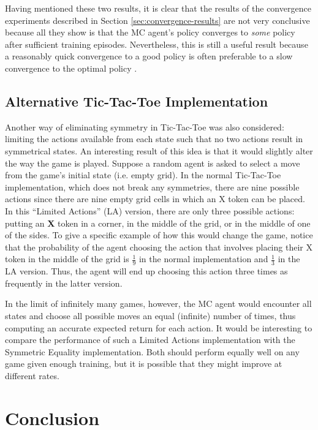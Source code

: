 \documentclass[11pt,a4paper,twoside,openright]{report}
\begin{document}
Having mentioned these two results, it is clear that the results of the convergence experiments described in Section \ref{sec:convergence-results} are not very conclusive because all they show is that the MC agent's policy converges to \emph{some} policy after sufficient training episodes. Nevertheless, this is still a useful result because a reasonably quick convergence to a good policy is often preferable to a slow convergence to the optimal policy \cite{rl-a-survey}.


\section{Alternative Tic-Tac-Toe Implementation}

Another way of eliminating symmetry in Tic-Tac-Toe was also considered: limiting the actions available from each state such that no two actions result in symmetrical states. An interesting result of this idea is that it would slightly alter the way the game is played. Suppose a random agent is asked to select a move from the game's initial state (i.e. empty grid). In the normal Tic-Tac-Toe implementation, which does not break any symmetries, there are nine possible actions since there are nine empty grid cells in which an X token can be placed. In this ``Limited Actions'' (LA) version, there are only three possible actions: putting an \textbf{X} token in a corner, in the middle of the grid, or in the middle of one of the sides. To give a specific example of how this would change the game, notice that the probability of the agent choosing the action that involves placing their X token in the middle of the grid is $\frac{1}{9}$ in the normal implementation and $\frac{1}{3}$ in the LA version. Thus, the agent will end up choosing this action three times as frequently in the latter version.

In the limit of infinitely many games, however, the MC agent would encounter all states and choose all possible moves an equal (infinite) number of times, thus computing an accurate expected return for each action. It would be interesting to compare the performance of such a Limited Actions implementation with the Symmetric Equality implementation. Both should perform equally well on any game given enough training, but it is possible that they might improve at different rates.


\chapter{Conclusion}
\end{document}
